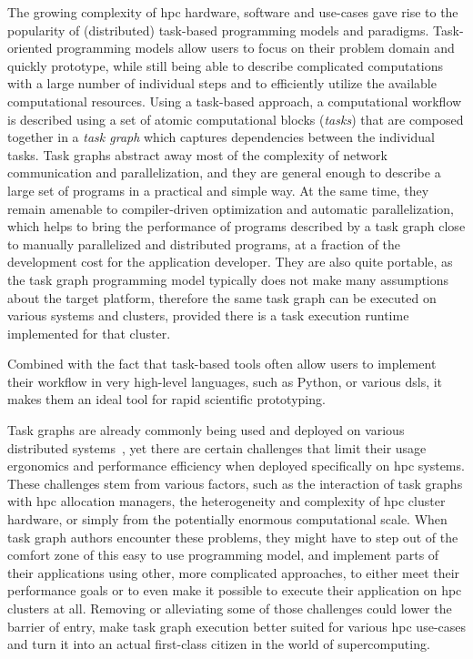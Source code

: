 The growing complexity of \gls{hpc} hardware, software and use-cases gave rise to the
popularity of (distributed) task-based programming models and paradigms. Task-oriented programming
models allow users to focus on their problem domain and quickly prototype, while still being able to
describe complicated computations with a large number of individual steps and to efficiently
utilize the available computational resources. Using a task-based approach, a computational
workflow is described using a set of atomic computational blocks (\emph{tasks}) that are
composed together in a \emph{task graph} which captures dependencies between the individual
tasks. Task graphs abstract away most of the complexity of network communication and
parallelization, and they are general enough to describe a large set of programs in a practical and
simple way. At the same time, they remain amenable to compiler-driven optimization and automatic
parallelization, which helps to bring the performance of programs described by a task graph close
to manually parallelized and distributed programs, at a fraction of the development cost for the
application developer. They are also quite portable, as the task graph programming model typically
does not make many assumptions about the target platform, therefore the same task graph can be
executed on various systems and clusters, provided there is a task execution runtime implemented
for that cluster.

Combined with the fact that task-based tools often allow users to implement their workflow in
very high-level languages, such as Python, or various \glspl{dsl}, it makes them an ideal
tool for rapid scientific prototyping.

Task graphs are already commonly being used and deployed on various distributed
systems~\cite{pegasus, workflows_at_scale, large_scale_modelling}, yet there are certain
challenges that limit their usage ergonomics and performance efficiency when deployed specifically
on \gls{hpc} systems. These challenges stem from various factors, such as the interaction of
task graphs with \gls{hpc} allocation managers, the heterogeneity and complexity of
\gls{hpc} cluster hardware, or simply from the potentially enormous computational
scale. When task graph authors encounter these problems, they might have to step out of the comfort
zone of this easy to use programming model, and implement parts of their applications using other,
more complicated approaches, to either meet their performance goals or to even make it possible to
execute their application on \gls{hpc} clusters at all. Removing or alleviating some
of those challenges could lower the barrier of entry, make task graph execution better suited for
various \gls{hpc} use-cases and turn it into an actual first-class citizen in the
world of supercomputing\@.

